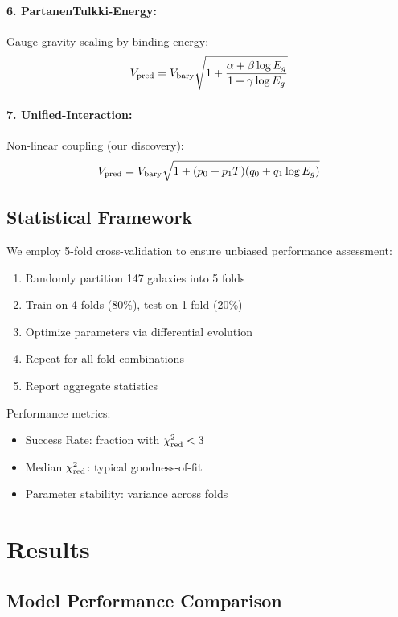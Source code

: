 \documentclass[aps,prd,twocolumn,superscriptaddress,nofootinbib,longbibliography]{revtex4-2}
\begin{document}
\paragraph{6. PartanenTulkki-Energy:} Gauge gravity scaling by binding energy:
\begin{equation}
V_{\rm pred} = V_{\rm bary} \sqrt{1 + \frac{\alpha + \beta \log E_g}{1 + \gamma \log E_g}}
\end{equation}

\paragraph{7. Unified-Interaction:} Non-linear coupling (our discovery):
\begin{equation}
V_{\rm pred} = V_{\rm bary} \sqrt{1 + (p_0 + p_1 T)(q_0 + q_1 \log E_g)}
\label{eq:unified}
\end{equation}

\subsection{Statistical Framework}

We employ 5-fold cross-validation to ensure unbiased performance assessment:
\begin{enumerate}
\item Randomly partition 147 galaxies into 5 folds
\item Train on 4 folds (80\%), test on 1 fold (20\%)
\item Optimize parameters via differential evolution \cite{Storn1997}
\item Repeat for all fold combinations
\item Report aggregate statistics
\end{enumerate}

Performance metrics:
\begin{itemize}
\item Success Rate: fraction with $\chi^2_{\rm red} < 3$
\item Median $\chi^2_{\rm red}$: typical goodness-of-fit
\item Parameter stability: variance across folds
\end{itemize}

\section{Results}

\subsection{Model Performance Comparison}
\end{document}
